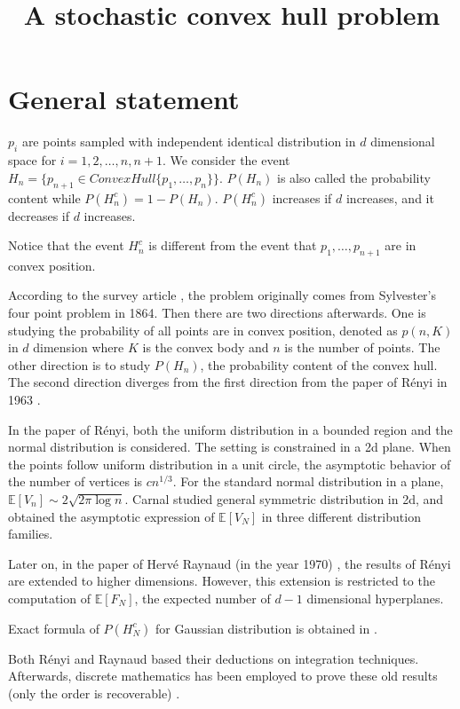 \documentclass{article}
\title{A stochastic convex hull problem}
\def\E{\mathbb{E}}
\begin{document}
\maketitle
\section{General statement}
$p_i$ are points sampled with independent identical distribution in $d$ dimensional space
for $i=1,2,\dots, n, n+1$. We consider the event
$H_n =\{p_{n+1} \in ConvexHull\{p_1,
\dots, p_n\} \}$. $P(H_n)$ is also called
the probability content while
$P(H_n^c)
=1-P(H_n)$.
$P(H_n^c)$ increases if $d$ increases,
and it decreases if $d$ increases.

Notice that the event $H^c_n$ is different
from the event that $p_1, \dots, p_{n+1}$
are in convex position.

According to the survey article
\cite{barany2008random},
the problem originally comes from Sylvester's four point problem
in 1864. Then there are two directions afterwards.
One is studying the probability of all points are in convex
position, denoted as $p(n, K)$ in $d$ dimension where $K$ is the convex body
and $n$ is the number of points.
The other direction is to study $P(H_n)$, the probability content of the convex hull.
The second direction diverges from the first direction
from the paper of Rényi in 1963 \cite{renyi1963konvexe}.

In the paper of Rényi, both the uniform distribution in a bounded region
and the normal distribution is considered.
The setting is constrained in a 2d plane.
When the points follow uniform distribution
in a unit circle, the asymptotic behavior
of the number of vertices is $cn^{1/3}$.
For the standard normal distribution in a plane,
$\E[V_n] \sim 2\sqrt{2\pi \log n}$.
Carnal \cite{carnal1970konvexe} studied  general symmetric distribution in 2d,
and obtained the asymptotic expression of $\E[V_N]$
in three different distribution families.


Later on, in the paper of Hervé Raynaud (in the year 1970)
\cite{raynaud1970enveloppe},
the results
of Rényi are extended to higher dimensions.
However, this extension is restricted to the
computation of $\E[F_N]$, the expected number of
$d-1$ dimensional hyperplanes.

Exact formula of $P(H_N^c)$
for Gaussian distribution is obtained in \cite{kabluchko2020absorption}.

Both Rényi and Raynaud
based their deductions on integration techniques.
Afterwards, discrete mathematics has been
employed to prove these old results (only the order
is recoverable) \cite{har2011expected}.
\end{document}
